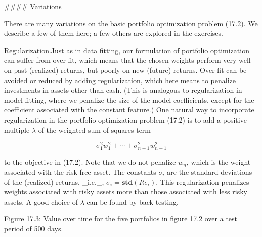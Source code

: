 

#### Variations

There are many variations on the basic portfolio optimization problem (17.2). We describe a few of them here; a few others are explored in the exercises.

Regularization.Just as in data fitting, our formulation of portfolio optimization can suffer from over-fit, which means that the chosen weights perform very well on past (realized) returns, but poorly on new (future) returns. Over-fit can be avoided or reduced by adding regularization, which here means to penalize investments in assets other than cash. (This is analogous to regularization in model fitting, where we penalize the size of the model coefficients, except for the coefficient associated with the constant feature.) One natural way to incorporate regularization in the portfolio optimization problem (17.2) is to add a positive multiple \(\lambda\) of the weighted sum of squares term

\[\sigma_{1}^{2}w_{1}^{2}+\cdots+\sigma_{n-1}^{2}w_{n-1}^{2}\]

to the objective in (17.2). Note that we do not penalize \(w_{n}\), which is the weight associated with the risk-free asset. The constants \(\sigma_{i}\) are the standard deviations of the (realized) returns, _i.e._, \(\sigma_{i}=\mathbf{std}(Re_{i})\). This regularization penalizes weights associated with risky assets more than those associated with less risky assets. A good choice of \(\lambda\) can be found by back-testing.

Figure 17.3: Value over time for the five portfolios in figure 17.2 over a test period of 500 days.

